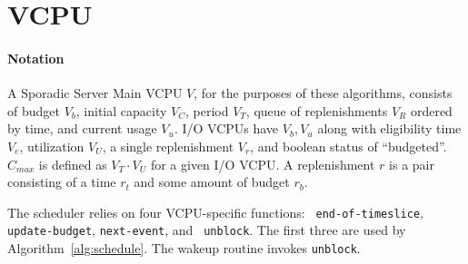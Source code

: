 \documentclass[twocolumn,10pt]{article}
\begin{document}
\newpage
\section{VCPU}


\paragraph{Notation} A Sporadic Server Main VCPU $V$, for the purposes
of these algorithms, consists of budget $V_b$, initial capacity $V_C$,
period $V_T$, queue of replenishments $V_R$ ordered by time, and
current usage $V_u$.  I/O VCPUs have $V_b, V_u$ along with eligibility
time $V_e$, utilization $V_U$, a single replenishment $V_r$, and
boolean status of ``budgeted''.  $C_{max}$ is defined as $V_T\cdot
V_U$ for a given I/O VCPU.  A replenishment $r$ is a pair consisting
of a time $r_t$ and some amount of budget $r_b$.

The scheduler relies on four VCPU-specific functions: {\tt
  end-of-timeslice}, {\tt update-budget}, {\tt next-event}, and {\tt
  unblock}.  The first three are used by Algorithm~\ref{alg:schedule}.
The wakeup routine invokes {\tt unblock}.
\end{document}
